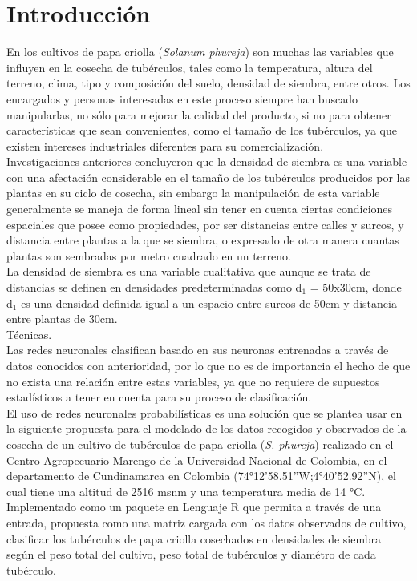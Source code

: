 

\chapter*{Introducci\'on}

En los cultivos de papa criolla (\textit{Solanum phureja}) son muchas las variables que influyen en la cosecha de tub\'erculos, tales como la temperatura, altura del terreno, clima, tipo y composici\'on del suelo, densidad de siembra, entre otros. Los encargados y personas interesadas en este proceso siempre han buscado manipularlas,  no sólo para mejorar la calidad del producto, si no para obtener caracter\'isticas que sean convenientes, como el tama\~no de los tub\'erculos, ya que existen intereses industriales diferentes para su comercializaci\'on.\\

Investigaciones anteriores concluyeron que la densidad de siembra es una variable con una afectaci\'on considerable en el tama\~no de los tub\'erculos producidos por las plantas en su ciclo de cosecha, sin embargo la manipulación de esta variable generalmente se maneja de forma lineal sin tener en cuenta ciertas condiciones espaciales que posee como propiedades, por  ser distancias entre calles y surcos, y distancia entre plantas a la que se siembra, o expresado de otra manera cuantas plantas son sembradas por metro cuadrado en un terreno.\\

La densidad de siembra es una variable cualitativa que aunque se trata de distancias se definen en densidades predeterminadas como d$_1$ = 50x30cm, donde d$_1$ es una densidad definida igual a un espacio entre surcos de 50cm y distancia entre plantas de 30cm.\\



Técnicas.\\

 
Las redes neuronales clasifican basado en sus neuronas entrenadas a través de datos conocidos con anterioridad, por lo que no es de importancia el hecho de que no exista una relación entre estas variables, ya que no requiere de supuestos estad\'isticos a tener en cuenta para su proceso de clasificación.\\


El uso de redes neuronales probabil\'isticas es una soluci\'on que se plantea usar en la siguiente propuesta para el modelado de los datos recogidos y observados de la cosecha de un cultivo de tubérculos de papa criolla (\textit{S. phureja}) realizado en el Centro Agropecuario Marengo de la Universidad Nacional de Colombia, en el departamento de Cundinamarca en Colombia (74°12'58.51''W;4°40'52.92''N), el cual tiene una altitud de 2516 msnm y una temperatura media de 14 °C. Implementado como un paquete en Lenguaje R que permita a través de una entrada, propuesta como una matriz cargada con los datos observados de cultivo, clasificar los tub\'erculos de papa criolla cosechados en densidades de siembra seg\'un el peso total del cultivo, peso total de tub\'erculos y diam\'etro de cada tub\'erculo.\\

